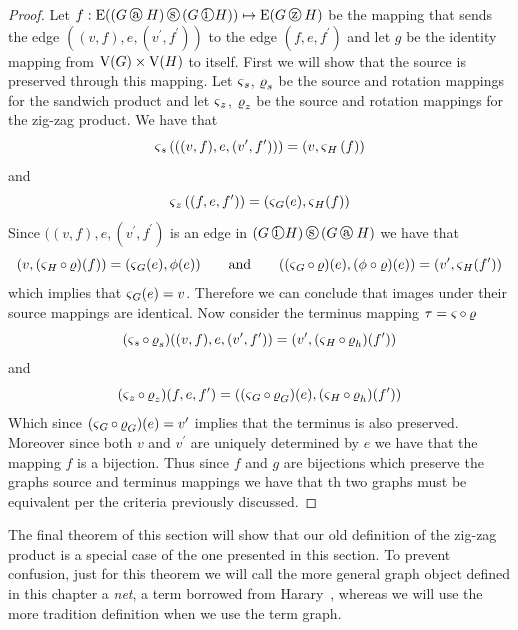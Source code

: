\begin{proof}

Let $f: \edgeS{ \left( G \zag H\right) \sandwich \left(G \zig H \right) } \mapsto \edgeS{G \zigzag H}$ be the mapping that sends the edge $\left(\left(v,f\right), e, \left(v^{\prime}, f^{\prime}\right)\right)$ to the edge $\left(f, e, f^{\prime} \right)$ and let $g$ be the identity mapping from $\mathrm{V}(G) \times \mathrm{V}(H)$ to itself. First we will show that the source is preserved through this mapping. Let $\operatorname{\mathbf{\varsigma}}_s$, $\operatorname{\mathbf{\varrho}}_s$ be the source and rotation mappings for the sandwich product and let $\operatorname{\mathbf{\varsigma}}_z$, $\operatorname{\mathbf{\varrho}}_z$ be the source and rotation mappings for the zig-zag product. We have that \[ 
\operatorname{\mathbf{\varsigma}}_{s}\left( ((v,f),e,(v^{\prime},f^{\prime} )) \right) =   (v, \operatorname{\mathbf{\varsigma}}_H\left(f\right) )
\] and \[ 
\operatorname{\mathbf{\varsigma}}_{z}\left((f,e,f^{\prime})\right) = \left(\operatorname{\mathbf{\varsigma}}_{G}(e), \operatorname{\mathbf{\varsigma}}_{H}(f) \right)
\] Since $((v,f),e,(v^{\prime},f^{\prime} )$ is an edge in $ \left( G \zig H\right) \sandwich \left(G \zag H \right)$ we have that \[ (v, (\operatorname{\mathbf{\varsigma}}_H \circ \operatorname{\mathbf{\varrho}})(f))  = (\operatorname{\mathbf{\varsigma}}_{G}(e), \phi(e)   ) \qquad \textrm{and} \qquad (  (\operatorname{\mathbf{\varsigma}}_G \circ \operatorname{\mathbf{\varrho}})(e), (\phi \circ \operatorname{\mathbf{\varrho}})(e)) = ( v^{\prime}, \operatorname{\mathbf{\varsigma}}_{H}(f^{\prime}))   \] which implies that $\operatorname{\mathbf{\varsigma}}_{G}(e) = v$. Therefore we can conclude that images under their source mappings are identical. Now consider the terminus mapping $\operatorname{\mathbf{\tau}} = \operatorname{\mathbf{\varsigma}} \circ \operatorname{\mathbf{\varrho}}$ \[
 (\operatorname{\mathbf{\varsigma}}_s \circ \operatorname{\mathbf{\varrho}}_s)((v,f),e,(v^{\prime},f^{\prime} )) = (v^{\prime}, (\operatorname{\mathbf{\varsigma}}_H \circ \operatorname{\mathbf{\varrho}}_h)(f^{\prime}))  
\] and \[
 (\operatorname{\mathbf{\varsigma}}_z \circ \operatorname{\mathbf{\varrho}}_z)(f,e,f^{\prime}) = ( (\operatorname{\mathbf{\varsigma}}_G \circ \operatorname{\mathbf{\varrho}}_G)(e), (\operatorname{\mathbf{\varsigma}}_H \circ \operatorname{\mathbf{\varrho}}_h)(f^{\prime} )) 
\] Which since $(\operatorname{\mathbf{\varsigma}}_G \circ \operatorname{\mathbf{\varrho}}_G)(e) = v^{\prime}$ implies that the terminus is also preserved. Moreover since both $v$ and $v^{\prime}$ are uniquely determined by $e$ we have that the mapping $f$ is a bijection. Thus since $f$ and $g$ are bijections which preserve the graphs source and terminus mappings we have that th two graphs must be equivalent per the criteria previously discussed. 
\end{proof}

The final theorem of this section will show that our old definition of the zig-zag product is a special case of the one presented in this section. To prevent confusion, just for this theorem we will call the more general graph object defined in this chapter a {\em net}, a term borrowed from Harary~\cite{Harary:1966},  whereas we will use the more tradition definition when we use the term graph.

